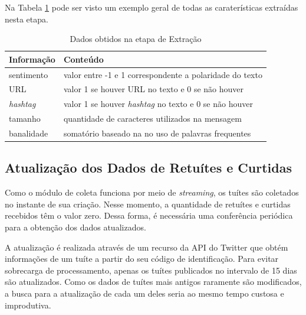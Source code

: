 \documentclass[oneside,openright,12pt]{ufsm_2015} %
\begin{document}
    \par Na Tabela \ref{tab:dados-extracao} pode ser visto um exemplo geral de todas as caraterísticas extraídas nesta etapa.

    \begin{table}[ht]
    \centering
    \caption{Dados obtidos na etapa de Extração}
    \label{tab:dados-extracao}
    \begin{tabular}{|l|l|}
    \hline
    \textbf{Informação} & \textbf{Conteúdo} \\ \hline
    sentimento & valor entre -1 e 1 correspondente a polaridade do texto \\ \hline
    URL & valor 1 se houver URL no texto e 0 se não houver \\ \hline
    \textit{hashtag} & valor 1 se houver \textit{hashtag} no texto e 0 se não houver \\ \hline
    tamanho & quantidade de caracteres utilizados na mensagem \\ \hline
    banalidade & somatório baseado na no uso de palavras frequentes \\ \hline
    \end{tabular}
    \end{table}



\subsection{Atualização dos Dados de Retuítes e Curtidas}
\label{sec:prop-atualizacao}

    \par Como o módulo de coleta funciona por meio de \textit{streaming}, os tuítes são coletados no instante de sua criação. Nesse momento, a quantidade de retuítes e curtidas recebidos têm o valor zero. Dessa forma, é necessária uma conferência periódica para a obtenção dos dados atualizados.
    
    \par A atualização é realizada através de um recurso da API do Twitter que obtém informações de um tuíte a partir do seu código de identificação. Para evitar sobrecarga de processamento, apenas os tuítes publicados no intervalo de 15 dias são atualizados. Como os dados de tuítes mais antigos raramente são modificados, a busca para a atualização de cada um deles seria ao mesmo tempo custosa e improdutiva.

\end{document}
